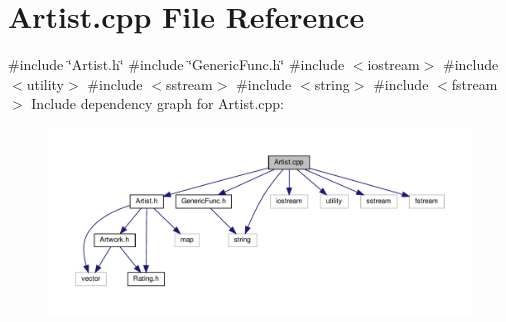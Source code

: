 \section{Artist.\+cpp File Reference}
\label{_artist_8cpp}
{\ttfamily \#include \char`\"{}Artist.\+h\char`\"{}}\newline
{\ttfamily \#include \char`\"{}Generic\+Func.\+h\char`\"{}}\newline
{\ttfamily \#include $<$iostream$>$}\newline
{\ttfamily \#include $<$utility$>$}\newline
{\ttfamily \#include $<$sstream$>$}\newline
{\ttfamily \#include $<$string$>$}\newline
{\ttfamily \#include $<$fstream$>$}\newline
Include dependency graph for Artist.\+cpp\+:\nopagebreak
\begin{figure}[H]
\begin{center}
\leavevmode
\includegraphics[width=350pt]{_artist_8cpp__incl}
\end{center}
\end{figure}
